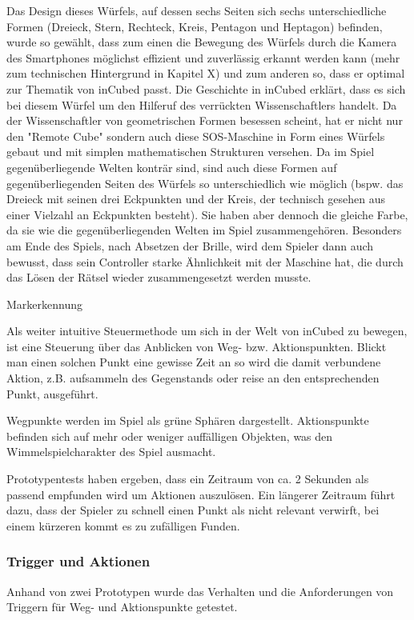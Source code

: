 Das Design dieses Würfels, auf dessen sechs Seiten sich sechs unterschiedliche Formen (Dreieck, Stern, Rechteck, Kreis, Pentagon und Heptagon) befinden, wurde so gewählt, dass zum einen die Bewegung des Würfels durch die Kamera des Smartphones möglichst effizient und zuverlässig erkannt werden kann (mehr zum technischen Hintergrund in Kapitel X) und zum anderen so, dass er optimal zur Thematik von inCubed passt. Die Geschichte in inCubed erklärt, dass es sich bei diesem Würfel um den Hilferuf des verrückten Wissenschaftlers handelt. Da der Wissenschaftler von geometrischen Formen besessen scheint, hat er nicht nur den "Remote Cube" sondern auch diese SOS-Maschine in Form eines Würfels gebaut und mit simplen mathematischen Strukturen versehen. Da im Spiel gegenüberliegende Welten konträr sind, sind auch diese Formen auf gegenüberliegenden Seiten des Würfels so unterschiedlich wie möglich (bspw. das Dreieck mit seinen drei Eckpunkten und der Kreis, der technisch gesehen aus einer Vielzahl an Eckpunkten besteht). Sie haben aber dennoch die gleiche Farbe, da sie wie die gegenüberliegenden Welten im Spiel zusammengehören. Besonders am Ende des Spiels, nach Absetzen der Brille, wird dem Spieler dann auch bewusst, dass sein Controller starke Ähnlichkeit mit der Maschine hat, die durch das Lösen der Rätsel wieder zusammengesetzt werden musste.

Markerkennung


Als weiter intuitive Steuermethode um sich in der Welt von inCubed zu bewegen, ist eine Steuerung über das Anblicken von Weg- bzw. Aktionspunkten. Blickt man einen solchen Punkt eine gewisse Zeit an so wird die damit verbundene Aktion, z.B. aufsammeln des Gegenstands oder reise an den entsprechenden Punkt, ausgeführt.

Wegpunkte werden im Spiel als grüne Sphären dargestellt. Aktionspunkte befinden sich auf mehr oder weniger auffälligen Objekten, was den Wimmelspielcharakter des Spiel ausmacht.

Prototypentests haben ergeben, dass ein Zeitraum von ca. 2 Sekunden als passend empfunden wird um Aktionen auszulösen. Ein längerer Zeitraum führt dazu, dass der Spieler zu schnell einen Punkt als nicht relevant verwirft, bei einem kürzeren kommt es zu zufälligen Funden.


\subsubsection{Trigger und Aktionen}
Anhand von zwei Prototypen wurde das Verhalten und die Anforderungen von Triggern für Weg- und Aktionspunkte getestet.


